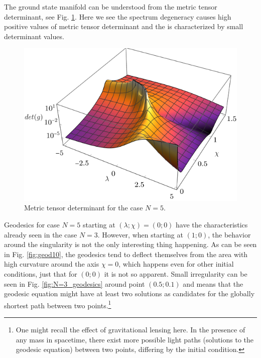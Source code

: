 The ground state manifold can be understood from the metric tensor determinant, see Fig. \ref{fig:N=5_det3D}. Here we see the spectrum degeneracy causes high positive values of metric tensor determinant and the  is characterized by small determinant values. 
\begin{figure}[H]
    \centering
    \includegraphics[scale=1.3]{../img/N=5_det3D.pdf}
    \caption{Metric tensor determinant for the case $N=5$.}
    \label{fig:N=5_det3D}    
\end{figure}



Geodesics for case $N=5$ starting at $(\lambda;\chi)=(0;0)$ have the characteristics already seen in the case $N=3$. However, when starting at $(1;0)$, the behavior around the singularity is not the only interesting thing happening. As can be seen in Fig. \ref{fig:geod10}, the geodesics tend to deflect themselves from the area with high curvature around the axis $\chi=0$, which happens even for other initial conditions, just that for $(0;0)$ it is not so apparent. Small irregularity can be seen in Fig. \ref{fig:N=3_geodesics} around point $(0.5;0.1)$ and means that the geodesic equation might have at least two solutions as candidates for the globally shortest path between two points.\footnote{One might recall the effect of gravitational lensing here. In the presence of any mass in spacetime, there exist more possible light paths (solutions to the geodesic equation) between two points, differing by the initial condition.} 




